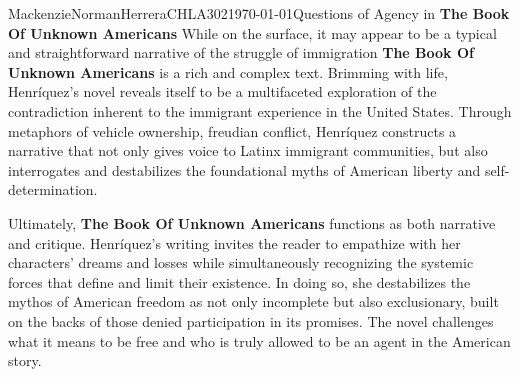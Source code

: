 \documentclass{article}
\begin{document}
\begin{mla}{Mackenzie}{Norman}{Herrera}{CHLA302}{\today}{Questions of Agency in \textbf{The Book Of Unknown Americans}}
While on the surface, it may appear to be a typical and straightforward narrative of the struggle of immigration  \textbf{\textbf{The Book Of Unknown Americans} }is a rich and complex text. Brimming with life, Henríquez’s novel reveals itself to be a multifaceted exploration of the contradiction inherent to the immigrant experience in the United States. Through metaphors of vehicle ownership, freudian conflict, Henríquez constructs a narrative that not only gives voice to Latinx immigrant communities, but also interrogates and destabilizes the foundational myths of American liberty and self-determination.  

Ultimately, \textbf{The Book Of Unknown Americans} functions as both narrative and critique. Henríquez’s writing invites the reader to empathize with her characters’ dreams and losses while simultaneously recognizing the systemic forces that define and limit their existence. In doing so, she destabilizes the mythos of American freedom as not only incomplete but also exclusionary, built on the backs of those denied participation in its promises. The novel challenges what it means to be free and who is truly allowed to be an agent in the American story.

\pagebreak

\printbibliography

\end{mla}
\end{document}

